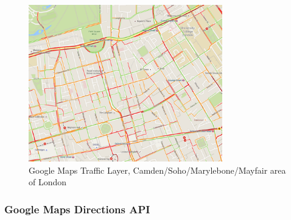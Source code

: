 \documentclass{CUP-JNL-DCE}
\begin{document}
\begin{figure}[htbp!] 
	\centering    
	\includegraphics[width=0.75\textwidth]{Picture23}
	\caption[Google Maps Traffic Layer, Camden/Soho/Marylebone/Mayfair area of London  \citep{google_maps}]{Google Maps Traffic Layer, Camden/Soho/Marylebone/Mayfair area of London  \citep{google_maps}}
	\label{fig:Picture3.23}
\end{figure}

\subsubsection{Google Maps Directions API}
\end{document}
